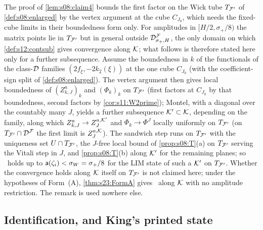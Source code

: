 \begin{remark}[amplitudes in $[H/2,\sigma_+/8)$: the route through the fixed-cube limits, for a further subsequence]\label{rem:s12:amplitudes}
The proof of \cref{lem:s08:claim4} bounds the first factor on the Wick tube $T_{\mathcal F'}$ of \cref{def:s08:enlarged} by the vertex argument at the cube $C_{J_0}$, which needs the fixed-cube limits in their boundedness form only. For amplitudes in $[H/2,\sigma_+/8)$ the matrix points lie in $T_{\mathcal F'}$ but in general outside $\mathcal D^{\mathcal F}_{\sigma_+,H}$, the only domain on which \cref{def:s12:contsub} gives convergence along $\mathcal K$; what follows is therefore stated here only for a further subsequence. Assume the boundedness in $k$ of the functionals of the class-$\mathcal D$ families $(2f_\xi,-2k_2(\xi))$ at the one cube $C_{J_0}$ (with the coefficient-sign split of \cref{def:s08:enlarged}). The vertex argument then gives local boundedness of $(Z^a_{k,J})_k$ and $(\Phi_k)_k$ on $T_{\mathcal F'}$ (first factors at $C_{J_0}$ by that boundedness, second factors by \cref{cor:s11:W2prime}); Montel, with a diagonal over the countably many $J$, yields a further subsequence $\mathcal K'\subset\mathcal K$, depending on the family, along which $Z^a_{k,J}\to Z^{a,\mathcal K'}_J$ and $\Phi_k\to\Phi^J$ locally uniformly on $T_{\mathcal F'}$ (on $T_{\mathcal F'}\cap\mathcal D^{\mathcal F}$ the first limit is $Z^{a,\mathcal K}_J$). The sandwich step runs on $T_{\mathcal F'}$ with the uniqueness set $U\cap T_{\mathcal F'}$, the $J$-free local bound of \cref{prop:s08:T}(a) on $T_{\mathcal F'}$ serving the Vitali step in $J$, and \cref{prop:s08:T}(b) along $\mathcal K'$ for the remaining planes; so \OSt\ holds up to $\mathsf a(\zeta_i)<\sigma_W=\sigma_+/8$ for the LIM state of such a $\mathcal K'$ on $T_{\mathcal F'}$. Whether the convergence holds along $\mathcal K$ itself on $T_{\mathcal F'}$ is not claimed here; under the hypotheses of Form~(A), \cref{thm:s23:FormA} gives \OSt\ along $\mathcal K$ with no amplitude restriction. The remark is used nowhere else.
\end{remark}

\subsection{Identification, and King's printed state}

